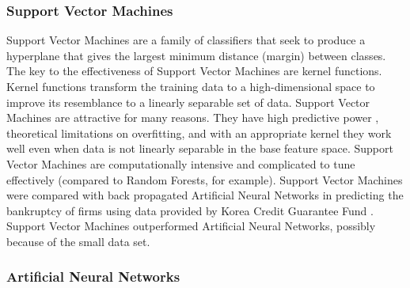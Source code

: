 \documentclass[../thesis/thesis.tex]{subfiles}
\begin{document}
\begin{refsection}
\subsubsection{Support Vector Machines}

Support Vector Machines are a family of classifiers that seek to produce a hyperplane that gives the largest minimum distance (margin) between classes. The key to the effectiveness of Support Vector Machines are kernel functions. Kernel functions transform the training data to a high-dimensional space to improve its resemblance to a linearly separable set of data. Support Vector Machines are attractive for many reasons. They have high predictive power \cite{caruana2006}, theoretical limitations on overfitting, and with an appropriate kernel they work well even when data is not linearly separable in the base feature space. Support Vector Machines are computationally intensive and complicated to tune effectively (compared to Random Forests, for example). Support Vector Machines were compared with back propagated Artificial Neural Networks in predicting the bankruptcy of firms using data provided by Korea Credit Guarantee Fund \cite{shin2005}. Support Vector Machines outperformed Artificial Neural Networks, possibly because of the small data set.

\subsubsection{Artificial Neural Networks}


\end{refsection}
\end{document}
